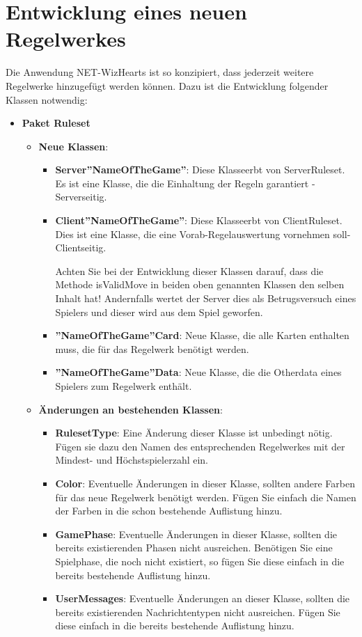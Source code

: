\documentclass[titlepage,10pt,a4paper]{article}
\begin{document}
\section{Entwicklung eines neuen \gls{Regelwerk}es}
Die Anwendung NET-WizHearts ist so konzipiert, dass jederzeit weitere \gls{Regelwerk}e hinzugefügt werden können.
Dazu ist die Entwicklung folgender Klassen notwendig:
\begin{itemize}
\item \textbf{Paket Ruleset}
	\begin{itemize}
	\item \textbf{Neue Klassen}:
		\begin{itemize}
		\item \textbf{Server''NameOfTheGame''}: Diese Klasseerbt von ServerRuleset. Es ist eine Klasse, die die Einhaltung der Regeln garantiert - Serverseitig.
		\item \textbf{Client''NameOfTheGame''}: Diese Klasseerbt von ClientRuleset. Dies ist eine Klasse, die eine Vorab-Regelauswertung vornehmen soll- Clientseitig.
	
		 Achten Sie bei der Entwicklung dieser Klassen darauf, dass die Methode isValidMove in beiden oben genannten Klassen den selben Inhalt hat! Andernfalls wertet der Server dies als Betrugsversuch eines Spielers und dieser wird aus dem Spiel geworfen.
		 \item \textbf{''NameOfTheGame''Card}: Neue Klasse, die alle Karten enthalten muss, die für das Regelwerk benötigt werden.
		\item \textbf{''NameOfTheGame''Data}: Neue Klasse, die die Otherdata eines Spielers zum Regelwerk enthält.
	\end{itemize}
	\item \textbf{Änderungen an bestehenden Klassen}:
		\begin{itemize}
		\item \textbf{RulesetType}: Eine Änderung dieser Klasse ist unbedingt nötig. Fügen sie dazu den Namen des entsprechenden Regelwerkes mit der Mindest- und Höchstspielerzahl ein.
		\item \textbf{Color}: Eventuelle Änderungen in dieser Klasse, sollten andere Farben für das neue Regelwerk benötigt werden. Fügen Sie einfach die Namen der Farben in die schon bestehende Auflistung hinzu.
		\item \textbf{GamePhase}: Eventuelle Änderungen in dieser Klasse, sollten die bereits existierenden Phasen nicht ausreichen. Benötigen Sie eine Spielphase, die noch nicht existiert, so fügen Sie diese einfach in die bereits bestehende Auflistung hinzu.
		\item \textbf{UserMessages}: Eventuelle Änderungen an dieser Klasse, sollten die bereits existierenden Nachrichtentypen nicht ausreichen. Fügen Sie diese einfach in die bereits bestehende Auflistung hinzu.
		\end{itemize}
	\end{itemize}
\end{itemize}

\newpage
\printglossaries
\end{document}
